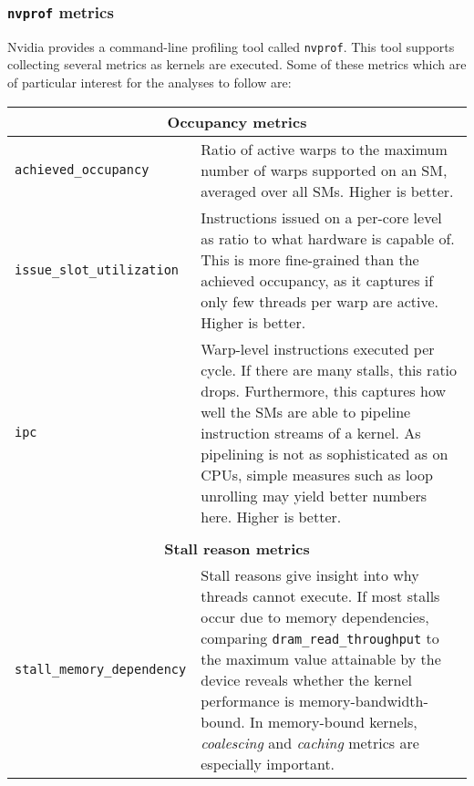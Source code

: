 \subsubsection{\texttt{nvprof} metrics} \label{sec:metrics}

Nvidia provides a command-line profiling tool called \texttt{nvprof}. This tool supports collecting several metrics as kernels are executed. Some of these metrics which are of particular interest for the analyses to follow are:

\begin{longtable}{p{} p{}}
	\multicolumn{2}{c}{\textbf{Occupancy metrics}} \\
	\hline
	\hline
	
	\raggedright \texttt{achieved\_\allowbreak occupancy} & Ratio of active warps to the maximum number of warps supported on an SM, averaged over all SMs. Higher is better. \\
	\hline
	\raggedright \texttt{issue\_\allowbreak slot\_\allowbreak utilization} & Instructions issued on a per-core level as ratio to what hardware is capable of. This is more fine-grained than the achieved occupancy, as it captures if only few threads per warp are active. Higher is better. \\
	\hline
	\raggedright \texttt{ipc} & Warp-level instructions executed per cycle. If there are many stalls, this ratio drops. Furthermore, this captures how well the SMs are able to pipeline instruction streams of a kernel. As pipelining is not as sophisticated as on CPUs, simple measures such as loop unrolling may yield better numbers here. Higher is better. \\
	
	\\
	\multicolumn{2}{c}{\textbf{Stall reason metrics}} \\
	\hline
	\hline
	\raggedright \texttt{stall\_\allowbreak memory\_\allowbreak dependency} & Stall reasons give insight into why threads cannot execute. If most stalls occur due to memory dependencies, comparing \texttt{dram\_read\_throughput} to the maximum value attainable by the device reveals whether the kernel performance is memory-bandwidth-bound. In memory-bound kernels, \textit{coalescing} and \textit{caching} metrics are especially important. \\
	

\end{longtable}
